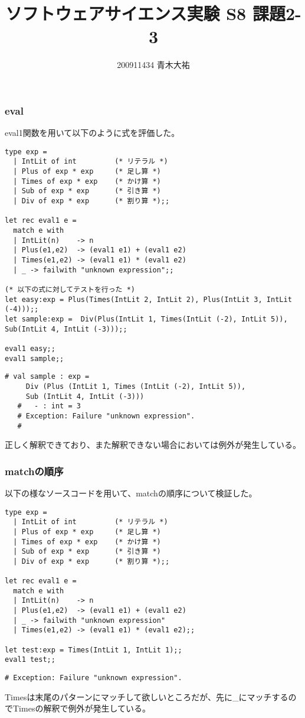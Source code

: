 \documentclass[a4paper,9pt]{jarticle}
\title{ソフトウェアサイエンス実験 S8 課題2-3}
\author{200911434 青木大祐}
\begin{document}
\maketitle
\setcounter{section}{2}
\setcounter{subsection}{3}

\newpage
\subsubsection{eval}
eval1関数を用いて以下のように式を評価した。

\begin{lstlisting}
type exp =
  | IntLit of int         (* リテラル *)
  | Plus of exp * exp     (* 足し算 *)
  | Times of exp * exp    (* かけ算 *)
  | Sub of exp * exp      (* 引き算 *)
  | Div of exp * exp      (* 割り算 *);;

let rec eval1 e =
  match e with
  | IntLit(n)    -> n
  | Plus(e1,e2)  -> (eval1 e1) + (eval1 e2)
  | Times(e1,e2) -> (eval1 e1) * (eval1 e2)
  | _ -> failwith "unknown expression";;

(* 以下の式に対してテストを行った *)
let easy:exp = Plus(Times(IntLit 2, IntLit 2), Plus(IntLit 3, IntLit (-4)));;
let sample:exp =  Div(Plus(IntLit 1, Times(IntLit (-2), IntLit 5)), Sub(IntLit 4, IntLit (-3)));;

eval1 easy;;
eval1 sample;;
\end{lstlisting}

\begin{lstlisting}[caption=実行結果]
   # val sample : exp =
     Div (Plus (IntLit 1, Times (IntLit (-2), IntLit 5)),
     Sub (IntLit 4, IntLit (-3)))
   #   - : int = 3
   # Exception: Failure "unknown expression".
   # 
\end{lstlisting}
正しく解釈できており、また解釈できない場合においては例外が発生している。

\subsubsection{matchの順序}
以下の様なソースコードを用いて、matchの順序について検証した。
\begin{lstlisting}
type exp =
  | IntLit of int         (* リテラル *)
  | Plus of exp * exp     (* 足し算 *)
  | Times of exp * exp    (* かけ算 *)
  | Sub of exp * exp      (* 引き算 *)
  | Div of exp * exp      (* 割り算 *);;

let rec eval1 e =
  match e with
  | IntLit(n)    -> n
  | Plus(e1,e2)  -> (eval1 e1) + (eval1 e2)
  | _ -> failwith "unknown expression"
  | Times(e1,e2) -> (eval1 e1) * (eval1 e2);;

let test:exp = Times(IntLit 1, IntLit 1);;
eval1 test;;
\end{lstlisting}
\begin{lstlisting}[caption=実行結果]
 # Exception: Failure "unknown expression".
\end{lstlisting}
Timesは末尾のパターンにマッチして欲しいところだが、先に\_にマッチするの
でTimesの解釈で例外が発生している。
\newpage
\end{document}
